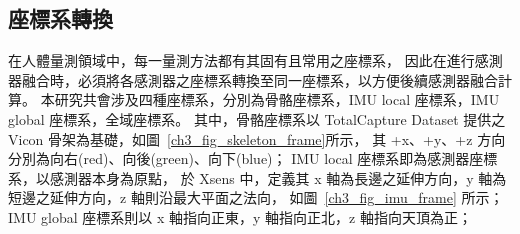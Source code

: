 \subsection{座標系轉換}
在人體量測領域中，每一量測方法都有其固有且常用之座標系，
因此在進行感測器融合時，必須將各感測器之座標系轉換至同一座標系，以方便後續感測器融合計算。
本研究共會涉及四種座標系，分別為骨骼座標系，IMU local 座標系，IMU global 座標系，全域座標系。
其中，骨骼座標系以 TotalCapture Dataset 提供之 Vicon 骨架為基礎，如圖~\ref{ch3_fig_skeleton_frame}所示，
其 +x、+y、+z 方向分別為向右(red)、向後(green)、向下(blue)；
IMU local 座標系即為感測器座標系，以感測器本身為原點，
於 Xsens 中，定義其 x 軸為長邊之延伸方向，y 軸為短邊之延伸方向，z 軸則沿最大平面之法向，
如圖~\ref{ch3_fig_imu_frame} 所示；
IMU global 座標系則以 x 軸指向正東，y 軸指向正北，z 軸指向天頂為正；
